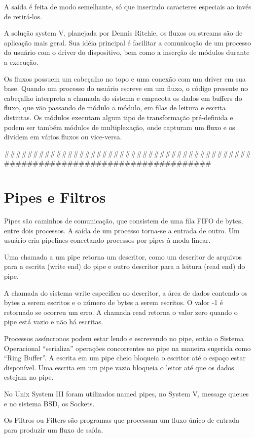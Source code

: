 A saída é feita de modo semelhante, só que inserindo caracteres especiais ao invés de retirá-los.

A solução system V, planejada por Dennis Ritchie, os fluxos ou streams são de aplicação mais geral. Sua idéia principal é facilitar a comunicação de um processo do usuário com o driver do dispositivo, bem como a inserção de módulos durante a execução.

Os fluxos possuem um cabeçalho no topo e uma conexão com um driver em sua base. Quando um processo do usuário escreve em um fluxo, o código presente no cabeçalho interpreta a chamada do sistema e empacota os dados em buffers do fluxo, que vão passando de módulo a módulo, em filas de leitura e escrita distintas. Os módulos executam algum tipo de transformação pré-definida e podem ser também módulos de multiplexação, onde capturam um fluxo e os dividem em vários fluxos ou vice-versa.

###############################################################################
\section{Pipes e Filtros}
Pipes são caminhos de comunicação, que consistem de uma fila FIFO de bytes, entre dois processos. A saída de um processo torna-se a entrada de outro. Um usuário cria pipelines conectando processos por pipes à moda linear.

Uma chamada a um pipe retorna um descritor, como um descritor de arquivos para a escrita (write end) do pipe e outro descritor para a leitura (read end) do pipe.

A chamada do sistema write especifica ao descritor, a área de dados contendo os bytes a serem escritos e o número de bytes a serem escritos. O valor -1 é retornado se ocorreu um erro. A chamada read retorna o valor zero quando o pipe está vazio e não há escritas.

Processos assíncronos podem estar lendo e escrevendo no pipe, então o Sistema Operacional “serializa” operações concorrentes no pipe na maneira sugerida como “Ring Buffer”. A escrita em um pipe cheio bloqueia o escritor até o espaço estar disponível. Uma escrita em um pipe vazio bloqueia o leitor até que os dados estejam no pipe.

No Unix System III foram utilizados named pipes, no System V, message queues e no sistema BSD, os Sockets.

Os Filtros ou Filters são programas que processam um fluxo único de entrada para produzir um fluxo de saída.